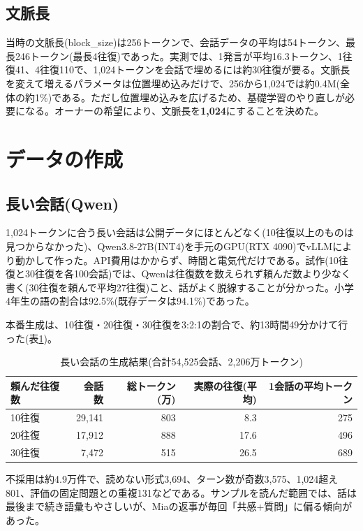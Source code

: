 \documentclass[a4paper,11pt]{article}
\begin{document}
\subsection{文脈長}
当時の文脈長(block\_size)は256トークンで、会話データの平均は54トークン、最長246トークン(最長4往復)であった。実測では、1発言が平均16.3トークン、1往復41、4往復110で、1,024トークンを会話で埋めるには約30往復が要る。文脈長を変えて増えるパラメータは位置埋め込みだけで、256から1,024では約0.4M(全体の約1\%)である。ただし位置埋め込みを広げるため、基礎学習のやり直しが必要になる。オーナーの希望により、文脈長を\textbf{1,024}にすることを決めた。

\section{データの作成}
\subsection{長い会話(Qwen)}
1,024トークンに合う長い会話は公開データにほとんどなく(10往復以上のものは見つからなかった)、Qwen3.8-27B(INT4)を手元のGPU(RTX 4090)でvLLMにより動かして作った。API費用はかからず、時間と電気代だけである。試作(10往復と30往復を各100会話)では、Qwenは往復数を数えられず頼んだ数より少なく書く(30往復を頼んで平均27往復)こと、話がよく脱線することが分かった。小学4年生の語の割合は92.5\%(既存データは94.1\%)であった。

本番生成は、10往復・20往復・30往復を3:2:1の割合で、約13時間49分かけて行った(表\ref{tab:long})。

\begin{table}[H]\centering\small
\caption{長い会話の生成結果(合計54,525会話、2,206万トークン)}\label{tab:long}
\begin{tabular}{lrrrr}\toprule
頼んだ往復数 & 会話数 & 総トークン(万) & 実際の往復(平均) & 1会話の平均トークン\\\midrule
10往復 & 29,141 & 803 & 8.3 & 275\\
20往復 & 17,912 & 888 & 17.6 & 496\\
30往復 & 7,472 & 515 & 26.5 & 689\\\bottomrule
\end{tabular}\end{table}

不採用は約4.9万件で、読めない形式3,694、ターン数が奇数3,575、1,024超え801、評価の固定問題との重複131などである。サンプルを読んだ範囲では、話は最後まで続き語彙もやさしいが、Miaの返事が毎回「共感+質問」に偏る傾向があった。
\end{document}
